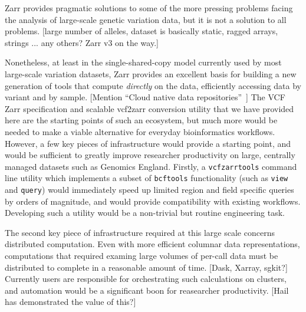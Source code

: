 \documentclass[a4paper,num-refs]{oup-contemporary}
\begin{document}
Zarr provides pragmatic solutions to some of the more pressing 
problems facing the analysis of large-scale genetic variation
data, but it is not a solution to all problems. [large number
of alleles, dataset is basically static, ragged arrays,
strings ... any others? Zarr v3 on the way.]

Nonetheless, at least in the single-shared-copy model currently
used by most large-scale variation datasets, Zarr provides
an excellent basis for building a new generation of tools 
that compute \emph{directly} on the data, efficiently
accessing data by variant and by sample.
[Mention ``Cloud native data repositories''~\cite{abernathey2021cloud}]
The VCF Zarr specification and scalable vcf2zarr conversion utility
that we have provided here are the starting points of such 
an ecosystem, but much more would be needed to make a viable 
alternative for everyday bioinformatics workflows. However, a few key
pieces of infrastructure would provide a starting point, and would 
be sufficient to greatly improve researcher productivity on 
large, centrally managed datasets such as Genomics England.
Firstly, a \texttt{vcfzarrtools} command line utility which 
implements a subset of \texttt{bcftools} functionality (such as 
\texttt{view} and \texttt{query}) would immediately speed up 
limited region and field specific queries by orders of magnitude,
and would provide compatibility with existing workflows.
Developing such a utility would be a non-trivial but routine
engineering task.

The second key piece of infrastructure required at this large 
scale concerns distributed computation. Even with more efficient
columnar data representations, computations that required examing 
large volumes of per-call data must be distributed to complete 
in a reasonable amount of time. [Dask, Xarray, sgkit?]
Currently users are responsible for orchestrating such calculations
on clusters, and automation would be a significant boon
for reasearcher productivity. [Hail has demonstrated the value of this?]



\end{document}
